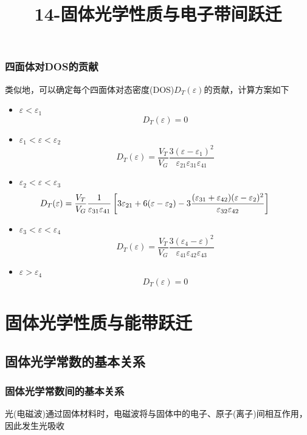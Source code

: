\frame
{
	\frametitle{四面体对\textrm{DOS}的贡献}
	类似地，可以确定每个四面体对态密度(\textrm{DOS})$D_T(\varepsilon)$的贡献，计算方案如下
	\begin{itemize}
	\item $\varepsilon<\varepsilon_1$
		\begin{displaymath}
			D_T(\varepsilon)=0
		\end{displaymath}
	\item $\varepsilon_1<\varepsilon<\varepsilon_2$
		\begin{displaymath}
			D_T(\varepsilon)=\dfrac{V_T}{V_G}\dfrac{3(\varepsilon-\varepsilon_1)^2}{\varepsilon_{21}\varepsilon_{31}\varepsilon_{41}}
		\end{displaymath}
	\item $\varepsilon_2<\varepsilon<\varepsilon_3$
		\begin{displaymath}
			\hspace*{-25pt}	D_T(\varepsilon)=\dfrac{V_T}{V_G}\dfrac1{\varepsilon_{31}\varepsilon_{41}}\left[3\varepsilon_{21}+6(\varepsilon-\varepsilon_2)-3\dfrac{(\varepsilon_{31}+\varepsilon_{42})(\varepsilon-\varepsilon_2)^2}{\varepsilon_{32}\varepsilon_{42}}\right]
		\end{displaymath}
	\item $\varepsilon_3<\varepsilon<\varepsilon_4$
		\begin{displaymath}
			D_T(\varepsilon)=\dfrac{V_T}{V_G}\dfrac{3(\varepsilon_4-\varepsilon)^2}{\varepsilon_{41}\varepsilon_{42}\varepsilon_{43}}
		\end{displaymath}
	\item $\varepsilon>\varepsilon_4$
		\begin{displaymath}
			D_T(\varepsilon)=0
		\end{displaymath}
	\end{itemize}
}

\title{14-固体光学性质与电子带间跃迁}
\section{固体光学性质与能带跃迁}
\subsection{固体光学常数的基本关系}
\frame
{
	\frametitle{固体光学常数间的基本关系}
	光(电磁波)通过固体材料时，电磁波将与固体中的电子、原子(离子)间相互作用，因此发生光吸收
\begin{figure}[h!]
	\vspace{-3pt}
\centering
{}
\caption{\fontsize{5.5pt}{4.2pt}}%
\label{Light-Wave}
\end{figure}
}

